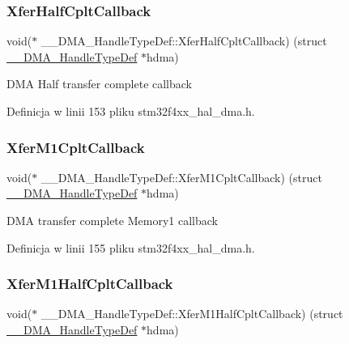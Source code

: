 \subsubsection{\texorpdfstring{Xfer\+Half\+Cplt\+Callback}{XferHalfCpltCallback}}
{\footnotesize\ttfamily void($\ast$  \+\_\+\+\_\+\+D\+M\+A\+\_\+\+Handle\+Type\+Def\+::\+Xfer\+Half\+Cplt\+Callback) (struct \hyperlink{struct_____d_m_a___handle_type_def}{\+\_\+\+\_\+\+D\+M\+A\+\_\+\+Handle\+Type\+Def} $\ast$hdma)}

D\+MA Half transfer complete callback 

Definicja w linii 153 pliku stm32f4xx\+\_\+hal\+\_\+dma.\+h.

\mbox{\label{struct_____d_m_a___handle_type_def_a5968053a3674b44460c1aa150499e01d}} 
\subsubsection{\texorpdfstring{Xfer\+M1\+Cplt\+Callback}{XferM1CpltCallback}}
{\footnotesize\ttfamily void($\ast$  \+\_\+\+\_\+\+D\+M\+A\+\_\+\+Handle\+Type\+Def\+::\+Xfer\+M1\+Cplt\+Callback) (struct \hyperlink{struct_____d_m_a___handle_type_def}{\+\_\+\+\_\+\+D\+M\+A\+\_\+\+Handle\+Type\+Def} $\ast$hdma)}

D\+MA transfer complete Memory1 callback 

Definicja w linii 155 pliku stm32f4xx\+\_\+hal\+\_\+dma.\+h.

\mbox{\label{struct_____d_m_a___handle_type_def_aea9b02c5206e1b12380e0b83b5281e0d}} 
\subsubsection{\texorpdfstring{Xfer\+M1\+Half\+Cplt\+Callback}{XferM1HalfCpltCallback}}
{\footnotesize\ttfamily void($\ast$  \+\_\+\+\_\+\+D\+M\+A\+\_\+\+Handle\+Type\+Def\+::\+Xfer\+M1\+Half\+Cplt\+Callback) (struct \hyperlink{struct_____d_m_a___handle_type_def}{\+\_\+\+\_\+\+D\+M\+A\+\_\+\+Handle\+Type\+Def} $\ast$hdma)}

